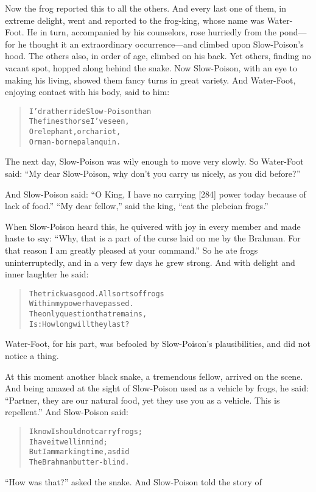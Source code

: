 \documentclass[article, twoside, 14pt]{memoir}
\renewenvironment{verbatim}{%
\begin{quote}%
\vskip -10pt%
\begin{alltt}\normalfont\large}{\end{alltt}%
\end{quote}%
\vskip -10pt
} %
\begin{document}
Now the frog reported this to all the others. And every last one of
them, in extreme delight, went and reported to the frog-king, whose
name was Water-Foot. He in turn, accompanied by his counselors,
rose hurriedly from the pond---for he thought it an extraordinary
occurrence---and climbed upon Slow-Poison's hood. The others also,
in order of age, climbed on his back. Yet others, finding no vacant
spot, hopped along behind the snake. Now Slow-Poison, with an eye
to making his living, showed them fancy turns in great variety. And
Water-Foot, enjoying contact with his body, said to him:

\begin{verbatim}
I'd rather ride Slow-Poison than
The finest horse I've seen,
Or elephant, or chariot,
Or man-borne palanquin.
\end{verbatim}
The next day, Slow-Poison was wily enough to move very slowly. So
Water-Foot said:
``My dear Slow-Poison, why don't you carry us nicely, as you did before?''

And Slow-Poison said:
``O King, I have no carrying [284] power today because of lack of food.''
``My dear fellow,'' said the king, ``eat the plebeian frogs.''

When Slow-Poison heard this, he quivered with joy in every member
and made haste to say:
``Why, that is a part of the curse laid on me by the Brahman. For that reason I am greatly pleased at your command.''
So he ate frogs uninterruptedly, and in a very few days he grew
strong. And with delight and inner laughter he said:

\begin{verbatim}
The trick was good. All sorts of frogs
    Within my power have passed.
The only question that remains,
    Is: How long will they last?
\end{verbatim}
Water-Foot, for his part, was befooled by Slow-Poison's
plausibilities, and did not notice a thing.

At this moment another black snake, a tremendous fellow, arrived on
the scene. And being amazed at the sight of Slow-Poison used as a
vehicle by frogs, he said:
``Partner, they are our natural food, yet they use you as a vehicle. This is repellent.''
And Slow-Poison said:

\begin{verbatim}
I know I should not carry frogs;
    I have it well in mind;
But I am marking time, as did
    The Brahman butter-blind.
\end{verbatim}
``How was that?'' asked the snake. And Slow-Poison told the story
of
\end{document}
